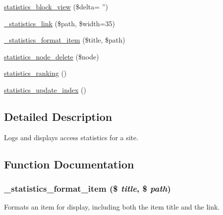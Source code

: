 \begin{DoxyCompactItemize}
\hyperlink{statistics_8module_ab362991a11f282c0379b1e98124fa653}{statistics\_\-block\_\-view} (\$delta= '')
\item 
\hyperlink{statistics_8module_a671374acaca873cc981716633107d664}{\_\-statistics\_\-link} (\$path, \$width=35)
\item 
\hyperlink{statistics_8module_a8674da52ead1a8ebf04b28eb2710bd87}{\_\-statistics\_\-format\_\-item} (\$title, \$path)
\item 
\hyperlink{statistics_8module_ad05403b236249d273b4c19755a4f6b0a}{statistics\_\-node\_\-delete} (\$node)
\item 
\hyperlink{statistics_8module_a725cf7357a2f66e80373d7c2975554fa}{statistics\_\-ranking} ()
\item 
\hyperlink{statistics_8module_a2d7056d1f9f2be0964a02112f50e1a33}{statistics\_\-update\_\-index} ()
\end{DoxyCompactItemize}


\subsection{Detailed Description}
Logs and displays access statistics for a site. 

\subsection{Function Documentation}
\hypertarget{statistics_8module_a8674da52ead1a8ebf04b28eb2710bd87}{
\subsubsection[{\_\-statistics\_\-format\_\-item}]{\setlength{\rightskip}{0pt plus 5cm}\_\-statistics\_\-format\_\-item (\$ {\em title}, \/  \$ {\em path})}}
\label{statistics_8module_a8674da52ead1a8ebf04b28eb2710bd87}
Formats an item for display, including both the item title and the link.



